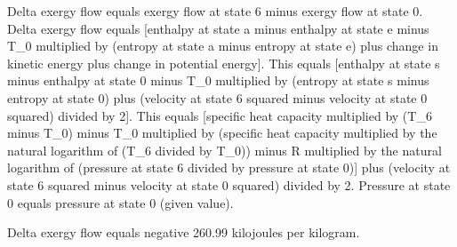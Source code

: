 Delta exergy flow equals exergy flow at state 6 minus exergy flow at state 0.  
Delta exergy flow equals [enthalpy at state a minus enthalpy at state e minus T_0 multiplied by (entropy at state a minus entropy at state e) plus change in kinetic energy plus change in potential energy].  
This equals [enthalpy at state s minus enthalpy at state 0 minus T_0 multiplied by (entropy at state s minus entropy at state 0) plus (velocity at state 6 squared minus velocity at state 0 squared) divided by 2].  
This equals [specific heat capacity multiplied by (T_6 minus T_0) minus T_0 multiplied by (specific heat capacity multiplied by the natural logarithm of (T_6 divided by T_0)) minus R multiplied by the natural logarithm of (pressure at state 6 divided by pressure at state 0)] plus (velocity at state 6 squared minus velocity at state 0 squared) divided by 2.  
Pressure at state 0 equals pressure at state 0 (given value).  

Delta exergy flow equals negative 260.99 kilojoules per kilogram.